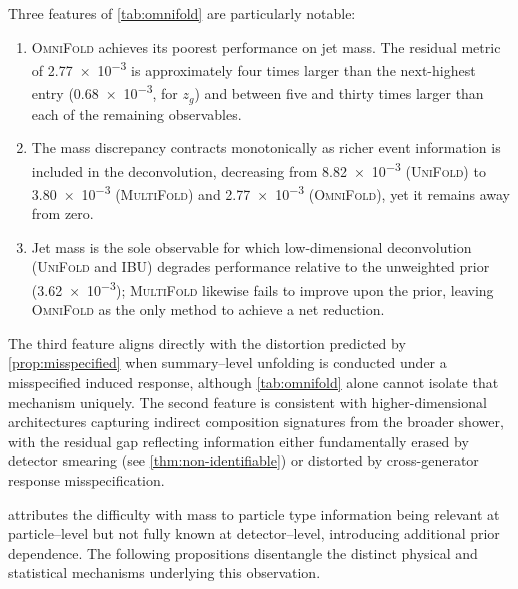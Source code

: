 \documentclass[12pt]{article}
\newcommand{\1}{\mathbbm{1}}
\renewcommand{\[}{\begin{equation}}
\renewcommand{\]}{\end{equation}}
\begin{document}
    Three features of \cref{tab:omnifold} are particularly notable:
    \begin{enumerate}
        \item \textsc{OmniFold} achieves its poorest performance on jet mass. The residual metric of \num{2.77e-3} is approximately four times larger than the next-highest entry (\num{0.68e-3}, for \(z_g\)) and between five and thirty times larger than each of the remaining observables.
        \item The mass discrepancy contracts monotonically as richer event information is included in the deconvolution, decreasing from \num{8.82e-3} (\textsc{UniFold}) to \num{3.80e-3} (\textsc{MultiFold}) and \num{2.77e-3} (\textsc{OmniFold}), yet it remains away from zero.
        \item Jet mass is the sole observable for which low-dimensional deconvolution (\textsc{UniFold} and IBU) degrades performance relative to the unweighted prior (\num{3.62e-3}); \textsc{MultiFold} likewise fails to improve upon the prior, leaving \textsc{OmniFold} as the only method to achieve a net reduction.
    \end{enumerate}
    
    The third feature aligns directly with the distortion predicted by \cref{prop:misspecified} when summary--level unfolding is conducted under a misspecified induced response, although \cref{tab:omnifold} alone cannot isolate that mechanism uniquely.
    The second feature is consistent with higher-dimensional architectures capturing indirect composition signatures from the broader shower, with the residual gap reflecting information either fundamentally erased by detector smearing (see \cref{thm:non-identifiable}) or distorted by cross-generator response misspecification.

    \textcite{Andreassen:2019cjw} attributes the difficulty with mass to particle type information being relevant at particle--level but not fully known at detector--level, introducing additional prior dependence.
    The following propositions disentangle the distinct physical and statistical mechanisms underlying this observation.
\end{document}

